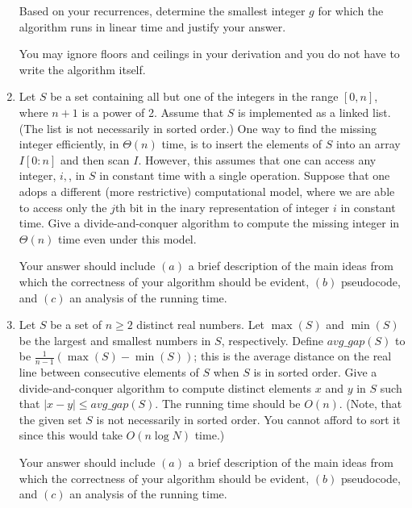 \documentclass[a4paper]{article}
\begin{document}
\begin{enumerate}
    Based on your recurrences, determine the smallest integer $g$ for which the algorithm runs in linear time and justify your answer.

    You may ignore floors and ceilings in your derivation and you do not have to write the algorithm itself.

  \item Let $S$ be a set containing all but one of the integers in the range $[0, n]$, where $n+1$ is a power of 2. Assume that $S$ is implemented as
    a linked list. (The list is not necessarily in sorted order.) One way to find the missing integer efficiently, in $\Theta(n)$ time, is to insert
    the elements of $S$ into an array $I[0:n]$ and then scan $I$. However, this assumes that one can access any integer, $i,$, in $S$ in constant time
    with a single operation. Suppose that one adops a different (more restrictive) computational model, where we are able to access only the $j$th bit
    in the inary representation of integer $i$ in constant time. Give a divide-and-conquer algorithm to compute the missing integer in $\Theta(n)$
    time even under this model.

    Your answer should include $(a)$ a brief description of the main ideas from which the correctness of your algorithm should be evident, $(b)$
    pseudocode, and $(c)$ an analysis of the running time.

  \item Let $S$ be a set of $n \geq 2$ distinct real numbers. Let $\max(S)$ and $\min(S)$ be the largest and smallest numbers in $S$, respectively.
    Define $avg\_gap(S)$ to be $\frac{1}{n-1} (\max(S) - \min(S))$; this is the average distance on the real line between consecutive elements of $S$
    when $S$ is in sorted order. Give a divide-and-conquer algorithm to compute distinct elements $x$ and $y$ in $S$ such that $|x-y| \leq
    avg\_gap(S)$. The running time should be $O(n)$. (Note, that the given set $S$ is not necessarily in sorted order. You cannot afford to sort it
    since this would take $O(n \log N)$ time.)

    Your answer should include $(a)$ a brief description of the main ideas from which the correctness of your algorithm should be evident, $(b)$
    pseudocode, and $(c)$ an analysis of the running time.
\end{enumerate}
\end{document}
